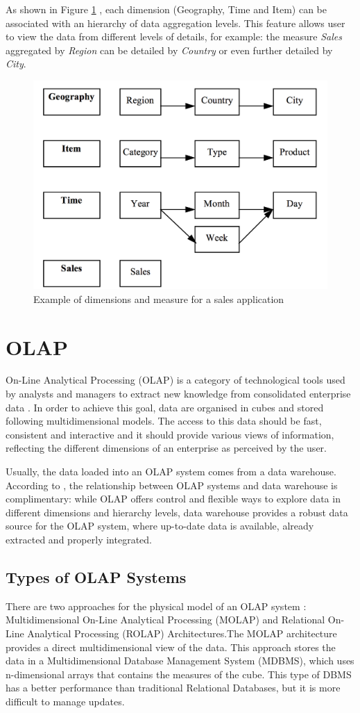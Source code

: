  
As shown in Figure \ref{fig:figure2} , each dimension (Geography, Time and Item) can be associated with an hierarchy of data aggregation levels. This feature allows user to view the data from different levels of details, for example: the measure \emph{Sales} aggregated by \emph{Region} can be detailed by \emph{Country} or even further detailed by \emph{City}.

\begin{figure}[ht]
\centering
\includegraphics[width=.6\textwidth]{../dimensions_measures_example.png}
\caption{Example of dimensions and measure for a sales application  \cite{Vassiliadis1998}}
\label{fig:figure2}
\end{figure}

\section{OLAP}
On-Line Analytical Processing (OLAP) is a category of technological tools used by analysts and managers to extract new knowledge from consolidated enterprise data \cite{OLAPCouncil}. In order to achieve this goal, data are organised in cubes and stored following multidimensional models. The access to this data should be fast, consistent and interactive and it should provide various views of information, reflecting the different dimensions of an enterprise as perceived by the user.
 
Usually, the data loaded into an OLAP system comes from a data warehouse. According to \cite{Inmon2005}, the relationship between OLAP systems and data warehouse is complimentary: while OLAP offers control and flexible ways to explore data in different dimensions and hierarchy levels, data warehouse provides a robust data source for the OLAP system, where up-to-date data is available, already extracted and properly integrated.

\subsection{Types of OLAP Systems}
There are two approaches for the physical model of an OLAP system \cite{Vassiliadis1999}: Multidimensional On-Line Analytical Processing (MOLAP) and Relational On-Line Analytical Processing (ROLAP) Architectures.The MOLAP architecture provides a direct multidimensional view of the data. This approach stores the data in a Multidimensional Database Management System (MDBMS), which uses n-dimensional arrays that contains the measures of the cube. This type of DBMS has a better performance than traditional Relational Databases, but it is more difficult to manage updates.
 
